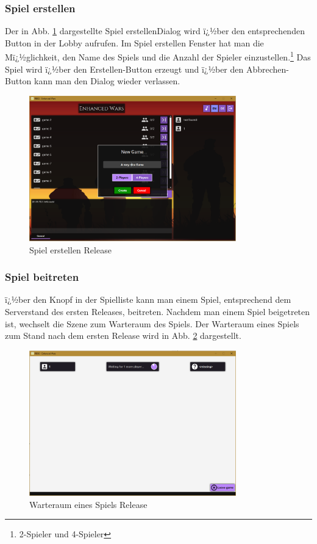 \documentclass[12pt, titlepage]{scrartcl}
\newcommand{\RN}[1]{%
	\textup{\uppercase\expandafter{\romannumeral#1}}%
}
\begin{document}
		\subsubsection{Spiel erstellen}
		Der in Abb. \ref{CreateGame_Release_One} dargestellte \glqq Spiel erstellen\grqq Dialog wird ï¿½ber den entsprechenden Button in der Lobby aufrufen. Im Spiel erstellen Fenster hat man die Mï¿½glichkeit, den Name des Spiels und die Anzahl der Spieler einzustellen.\footnote{2-Spieler und 4-Spieler} Das Spiel wird ï¿½ber den \glqq Erstellen\grqq-Button erzeugt und ï¿½ber den \glqq Abbrechen\grqq-Button kann man den Dialog wieder verlassen.
		\begin{figure}[H] 
			\centering
			\includegraphics[width=0.8\textwidth]{CreateGame_Release_One.PNG}
			\caption{Spiel erstellen Release \RN{1}}
			\label{CreateGame_Release_One}
		\end{figure}
		\subsubsection{Spiel beitreten}
		ï¿½ber den Knopf in der Spielliste kann man einem Spiel, entsprechend dem Serverstand des ersten Releases, beitreten. Nachdem man einem Spiel beigetreten ist, wechselt die Szene zum Warteraum des Spiels. Der Warteraum eines Spiels zum Stand nach dem ersten Release wird in Abb. \ref{WaitingRoom_Release_One} dargestellt.
		 \begin{figure}[H] 
		 	\centering
		 	\includegraphics[width=0.8\textwidth]{WaitingRoom_Release_One.PNG}
		 	\caption{Warteraum eines Spiels Release \RN{1}}
		 	\label{WaitingRoom_Release_One}
		 \end{figure}
\end{document}
